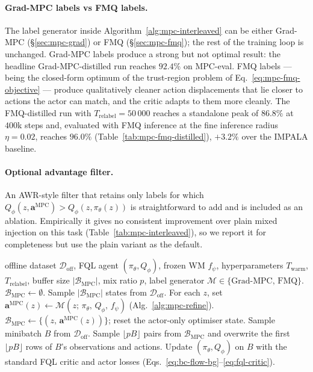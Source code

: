 \paragraph{Grad-MPC labels vs FMQ labels.} The label generator inside Algorithm~\ref{alg:mpc-interleaved} can be either Grad-MPC (\S\ref{sec:mpc-grad}) or FMQ (\S\ref{sec:mpc-fmq}); the rest of the training loop is unchanged. Grad-MPC labels produce a strong but not optimal result: the headline Grad-MPC-distilled run reaches $92.4\%$ on MPC-eval. FMQ labels --- being the closed-form optimum of the trust-region problem of Eq.~\eqref{eq:mpc-fmq-objective} --- produce qualitatively cleaner action displacements that lie closer to actions the actor can match, and the critic adapts to them more cleanly. The FMQ-distilled run with $T_{\text{relabel}} = 50\,000$ reaches a standalone peak of $86.8\%$ at $400$k steps and, evaluated with FMQ inference at the fine inference radius $\eta = 0.02$, reaches \textbf{$96.0\%$} (Table~\ref{tab:mpc-fmq-distilled}), $+3.2\%$ over the IMPALA baseline.

\paragraph{Optional advantage filter.} An AWR-style filter that retains only labels for which $Q_\phi(z, \mathbf{a}^{\text{MPC}}) > Q_\phi(z, \pi_\theta(z))$ is straightforward to add and is included as an ablation. Empirically it gives no consistent improvement over plain mixed injection on this task (Table~\ref{tab:mpc-interleaved}), so we report it for completeness but use the plain variant as the default.

\begin{algorithm}[t]
\caption{Interleaved MPC distillation.}
\label{alg:mpc-interleaved}
\begin{algorithmic}[1]
\Require offline dataset $\mathcal{D}_{\text{off}}$, FQL agent $(\pi_\theta, Q_\phi)$, frozen WM $f_\psi$, hyperparameters $T_{\text{warm}}$, $T_{\text{relabel}}$, buffer size $|\mathcal{B}_{\text{MPC}}|$, mix ratio $p$, label generator $\mathcal{M} \in \{\text{Grad-MPC},\, \text{FMQ}\}$.
\State $\mathcal{B}_{\text{MPC}} \leftarrow \emptyset$.
        \State Sample $|\mathcal{B}_{\text{MPC}}|$ states from $\mathcal{D}_{\text{off}}$.
        \State For each $z$, set $\mathbf{a}^{\text{MPC}}(z) \leftarrow \mathcal{M}(z;\,\pi_\theta,\,Q_\phi,\,f_\psi)$ (Alg.~\ref{alg:mpc-refine}).
        \State $\mathcal{B}_{\text{MPC}} \leftarrow \{(z,\,\mathbf{a}^{\text{MPC}}(z))\}$; reset the actor-only optimiser state.
    \EndIf
    \State Sample minibatch $B$ from $\mathcal{D}_{\text{off}}$.
        \State Sample $\lfloor pB \rfloor$ pairs from $\mathcal{B}_{\text{MPC}}$ and overwrite the first $\lfloor pB \rfloor$ rows of $B$'s observations and actions.
    \EndIf
    \State Update $(\pi_\theta, Q_\phi)$ on $B$ with the standard FQL critic and actor losses (Eqs.~\eqref{eq:bc-flow-bg}--\eqref{eq:fql-critic}).
\EndFor
\end{algorithmic}
\end{algorithm}

